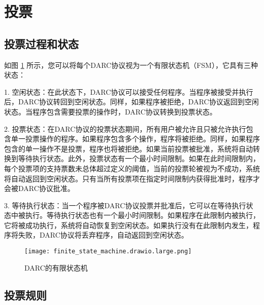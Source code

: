 \documentclass[main.tex]{subfiles}
\begin{document}
\section{投票}

\subsection{投票过程和状态}

如图 \ref{fig:FSM} 所示，您可以将每个DARC协议视为一个有限状态机（FSM），它具有三种状态：

1. 空闲状态：在此状态下，DARC协议可以接受任何程序。当程序被接受并执行后，DARC协议转回到空闲状态。同样，如果程序被拒绝，DARC协议返回到空闲状态。当程序包含需要投票的操作时，DARC协议转换到投票状态。

2. 投票状态：在DARC协议的投票状态期间，所有用户被允许且只被允许执行包含单一投票操作的程序。如果程序包含多个操作，程序将被拒绝。同样，如果程序包含的单一操作不是投票，程序也将被拒绝。如果当前投票被批准，系统将自动转换到等待执行状态。此外，投票状态有一个最小时间限制。如果在此时间限制内，每个投票项的支持票数未总体超过定义的阈值，当前的投票轮被视为不成功，系统将自动返回到空闲状态。只有当所有投票项在指定时间限制内获得批准时，程序才会被DARC协议批准。

3. 等待执行状态：当一个程序被DARC协议投票并批准后，它可以在等待执行状态中被执行。等待执行状态也有一个最小时间限制。如果程序在此限制内被执行，它将被成功执行，系统将自动恢复到空闲状态。如果执行没有在此限制内发生，程序将失败，DARC协议将丢弃程序，自动返回到空闲状态。

\begin{figure}
\centering
\texttt{[image: finite\_state\_machine.drawio.large.png]}
\caption{\label{fig:FSM}DARC的有限状态机}
\end{figure}

\subsection{投票规则}
\end{document}
